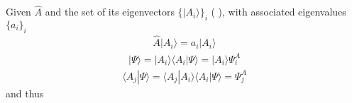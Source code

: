 \documentclass[letterpaper,10pt,english]{jupyterBook}
\begin{document}
\sphinxAtStartPar
Given \(\hat{A}\) and the set of its eigenvectors \(\{ |A_i \rangle \}_i\) ( ), with associated eigenvalues \(\{ a_i \}_i\)
\begin{equation*}
\begin{split}\hat{A} |A_i \rangle = a_i |A_i\rangle\end{split}
\end{equation*}\begin{equation*}
\begin{split}| \Psi \rangle = | A_i \rangle \langle A_i | \Psi \rangle =  | A_i \rangle \Psi_i^A \end{split}
\end{equation*}\begin{equation*}
\begin{split}\langle A_j | \Psi \rangle = \langle A_j | A_i \rangle \langle A_i | \Psi \rangle = \Psi_j^A \end{split}
\end{equation*}
\sphinxAtStartPar
and thus
\end{document}
